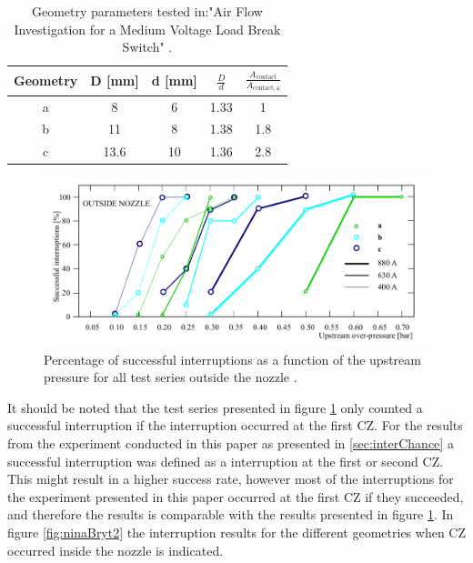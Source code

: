\documentclass[10pt,a4paper,twoside]{article}
\begin{document}
\begin{table}[H]
\center
\caption{Geometry parameters tested in:"Air Flow Investigation for a Medium Voltage Load Break Switch" \cite{bib:AFIMVLBA}.}
 \begin{tabular}{|c|c|c|c|c|}
\hline 
Geometry & D [mm] & d [mm] & $\frac{D}{d}$ & $\frac{A_\mathrm{{contact}}}{A_\mathrm{{contact,a}}}$ \\ 
\hline 
a & 8 & 6 & 1.33 & 1 \\ 
\hline 
b & 11 & 8 & 1.38 & 1.8 \\ 
\hline 
c & 13.6 & 10 & 1.36 & 2.8 \\ 
\hline 
\end{tabular} 
\label{tab:NinasGeo}
\end{table}

\begin{figure}[H]
  \centering
  \includegraphics[scale=0.4]{Bilder/Discussion/ninaResults.png}
  \caption{Percentage of successful interruptions as a function of the upstream pressure for all test series outside the nozzle \cite{bib:AFIMVLBA}.}
  \label{fig:ninaBryt}
\end{figure}

It should be noted that the test series presented in figure \ref{fig:ninaBryt} only counted a successful interruption if the interruption occurred at the first CZ. For the results from the experiment conducted in this paper as presented in \ref{sec:interChance} a successful interruption was defined as a interruption at the first or second CZ. This might result in a higher success rate, however most of the interruptions for the experiment presented in this paper occurred at the first CZ if they succeeded, and therefore the results is comparable with the results presented in figure \ref{fig:ninaBryt}. In figure \ref{fig:ninaBryt2} the interruption results for the different geometries when CZ occurred inside the nozzle is indicated.
\end{document}
